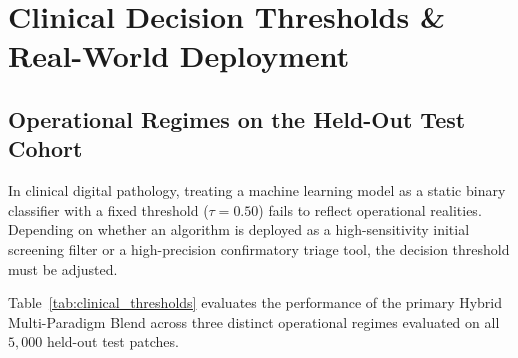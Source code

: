 \documentclass[11pt,a4paper]{article}
\begin{document}

\section{Clinical Decision Thresholds \& Real-World Deployment}

\subsection{Operational Regimes on the Held-Out Test Cohort}
In clinical digital pathology, treating a machine learning model as a static binary classifier with a fixed threshold ($\tau = 0.50$) fails to reflect operational realities. Depending on whether an algorithm is deployed as a high-sensitivity initial screening filter or a high-precision confirmatory triage tool, the decision threshold must be adjusted. 

Table~\ref{tab:clinical_thresholds} evaluates the performance of the primary Hybrid Multi-Paradigm Blend across three distinct operational regimes evaluated on all $5,000$ held-out test patches.

\begin{table}[H]
\centering
\small
\caption{Operational Clinical Performance of the Primary Hybrid Blend Across Decision Thresholds.}
\label{tab:clinical_thresholds}
\end{table}
\end{document}
